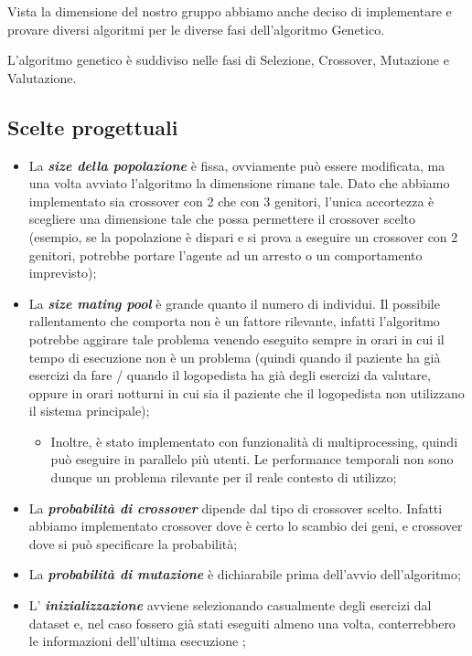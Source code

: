 \documentclass{article}
\begin{document}
Vista la dimensione del nostro gruppo abbiamo anche deciso di implementare e provare diversi algoritmi per le diverse fasi dell'algoritmo Genetico.

L'algoritmo genetico è suddiviso nelle fasi di Selezione, Crossover, Mutazione e Valutazione.

\subsection{Scelte progettuali}

\begin{itemize}
\item La \textbf{\textit{size della popolazione}} è fissa, ovviamente può essere modificata, ma una volta avviato l'algoritmo la dimensione rimane tale. Dato che abbiamo implementato sia crossover con 2 che con 3 genitori, l'unica accortezza è scegliere una dimensione tale che possa permettere il crossover scelto (esempio, se la popolazione è dispari e si prova a eseguire un crossover con 2 genitori, potrebbe portare l'agente ad un arresto o un comportamento imprevisto);

\item La \textbf{\textit{size mating pool}} è grande quanto il numero di individui. Il possibile rallentamento che comporta non è un fattore rilevante, infatti l'algoritmo potrebbe aggirare tale problema venendo eseguito sempre in orari in cui il tempo di esecuzione non è un problema (quindi quando il paziente ha già esercizi da fare / quando il logopedista ha già degli esercizi da valutare, oppure in orari notturni in cui sia il paziente che il logopedista non utilizzano il sistema principale);
\begin{itemize}
    \item Inoltre, è stato implementato con funzionalità di multiprocessing, quindi può eseguire in parallelo più utenti. Le performance temporali non sono dunque un problema rilevante per il reale contesto di utilizzo;
\end{itemize}
\item La \textbf{\textit{probabilità di crossover}} dipende dal tipo di crossover scelto. Infatti abbiamo implementato crossover dove è certo lo scambio dei geni, e crossover dove si può specificare la probabilità;

\item La \textbf{\textit{probabilità di mutazione}} è dichiarabile prima dell'avvio dell'algoritmo;

\item L' \textbf{\textit{inizializzazione}} avviene selezionando casualmente degli esercizi dal dataset e, nel caso fossero già stati eseguiti almeno una volta, conterrebbero le informazioni dell'ultima esecuzione ;


\end{itemize}
\end{document}
